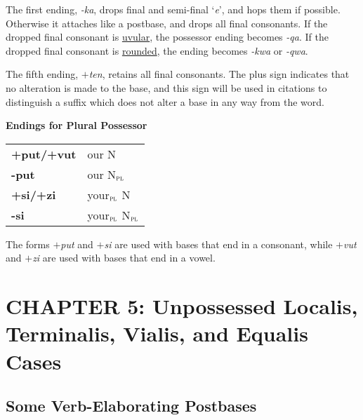 \documentclass{article}
\begin{document}
\vspace{12pt}

The first ending, \textit{-ka}, drops final and semi-final `\textit{e}', and hops them if possible.
%
Otherwise it attaches like a postbase, and drops all final consonants.
%
If the dropped final consonant is \underline{uvular}, the possessor ending becomes \textit{-qa}.
%
If the dropped final consonant is \underline{rounded}, the ending becomes \textit{-kwa} or \textit{-qwa}.

\vspace{12pt}

The fifth ending, \textit{$+$ten}, retains all final consonants.
%
The plus sign indicates that no alteration is made to the base, and this sign will be used in citations to distinguish a suffix which does not
alter a base in any way from the word.

\vspace{12pt}

\noindent \textbf{Endings for Plural Possessor}

\begin{tabular}{ l l }
\textbf{+put/+vut} & our N \\ 
\textbf{-put} & our N$_\text{\textsc{pl}}$ \\ 
\textbf{+si/+zi} & your$_\text{\textsc{pl}}$ N \\ 
\textbf{-si} & your$_\text{\textsc{pl}}$ N$_\text{\textsc{pl}}$ \\ 
\end{tabular}

\vspace{12pt}

The forms \textit{$+$put} and \textit{$+$si} are used with bases that end in a consonant, while \textit{$+$vut} and \textit{$+$zi} are used with bases that end in a vowel.


\section{CHAPTER 5: Unpossessed Localis, Terminalis, Vialis, and Equalis Cases}

\subsection{Some Verb-Elaborating Postbases}
\end{document}
